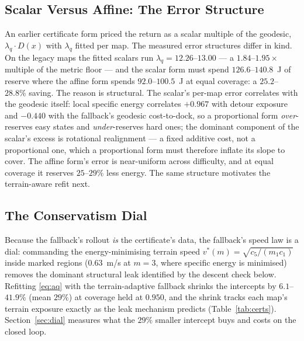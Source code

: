 \documentclass[preprint,12pt]{elsarticle}
\begin{document}
\subsection{Scalar Versus Affine: The Error Structure}
An earlier certificate form priced the return as a scalar multiple of
the geodesic, $\lambda_q \cdot D(x)$ with $\lambda_q$ fitted per map.
The measured error structures differ in kind.
 On the legacy maps the fitted scalars run $\lambda_q =
12.26$--$13.00$ --- a $1.84$--$1.95\times$ multiple of the metric
floor --- and the scalar form must spend $126.6$--$140.8$~J of
reserve where the affine form spends $92.0$--$100.5$~J at equal
coverage: a $25.2$--$28.8\%$ saving. The reason is structural. The
scalar's per-map error correlates with the geodesic itself: local
specific energy correlates $+0.967$ with detour exposure and
$-0.440$ with the fallback's geodesic cost-to-dock,
 so a proportional form \emph{over}-reserves easy states and
\emph{under}-reserves hard ones; the dominant component of the
scalar's excess is rotational realignment --- a fixed additive cost,
not a proportional one, which a proportional form must therefore
inflate its slope to cover. The affine form's error is
near-uniform across difficulty, and at equal coverage it reserves
$25$--$29\%$ less energy.
The same structure motivates the terrain-aware refit next.

\subsection{The Conservatism Dial}
Because the fallback's rollout \emph{is} the certificate's data, the
fallback's speed law is a dial: commanding the energy-minimising
terrain speed
$v^{*}(m) = \sqrt{c_5/(m_1 c_1)}$ inside marked regions ($0.63$~m/s at
$m{=}3$, where specific energy is minimised) removes the dominant
structural leak identified by the
descent check below. Refitting \eqref{eq:aq} with the terrain-adaptive
fallback shrinks the intercepts by $6.1$--$41.9\%$ (mean $29\%$) at
coverage held at $0.950$, and the shrink tracks each map's terrain
exposure exactly as the leak mechanism predicts
(Table~\ref{tab:certs}). Section~\ref{sec:dial} measures what the
$29\%$ smaller intercept buys and costs on the closed loop.
\end{document}
